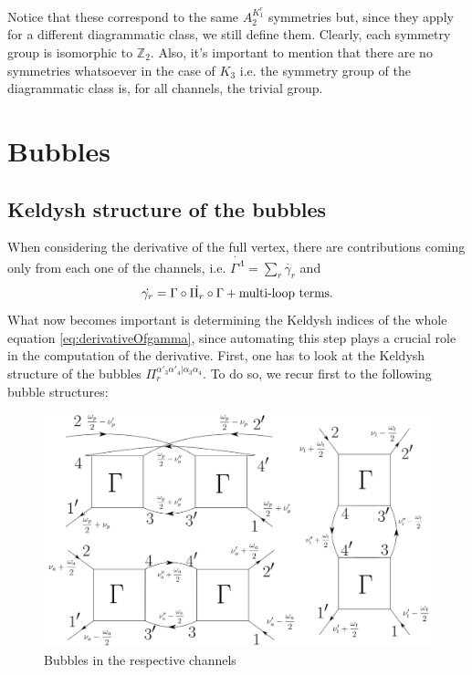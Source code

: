 \documentclass[12pt,a4paper,roman]{article}
\begin{document}
Notice that these correspond to the same $A_2^{K^r_1}$ symmetries but, since they apply for a different diagrammatic class, we still define them. Clearly, each symmetry group is isomorphic to $\mathbb{Z}_2$.
Also, it's important to mention that there are no symmetries whatsoever in the case of $K_3$ i.e. the symmetry group of the diagrammatic class is, for all channels, the trivial group.

\section*{Bubbles}
\subsection*{Keldysh structure of the bubbles}
When considering the derivative of the full vertex, there are contributions coming only from each one of the channels, i.e. $\dot{\Gamma^{\Lambda}} = \sum_r \dot{\gamma_r}$  and
\begin{equation}
\centering
\dot{\gamma_r} = \Gamma \circ \dot{\Pi_r} \circ \Gamma + \text{multi-loop terms}.
\label{eq:derivativeOfgamma}
\end{equation}
What now becomes important is determining the Keldysh indices of the whole equation \ref{eq:derivativeOfgamma}, since automating this step plays a crucial role in the computation of the derivative.
First, one has to look at the Keldysh structure of the bubbles $\Pi_r^{\alpha'_3\alpha'_4|\alpha_3\alpha_4}$. To do so, we recur first to the following bubble structures:

\begin{figure}[H]
	\centering
	\includegraphics[width=\textwidth]{all-Bubbles.png}
	\caption{Bubbles in the respective channels}
\end{figure}
\end{document}
